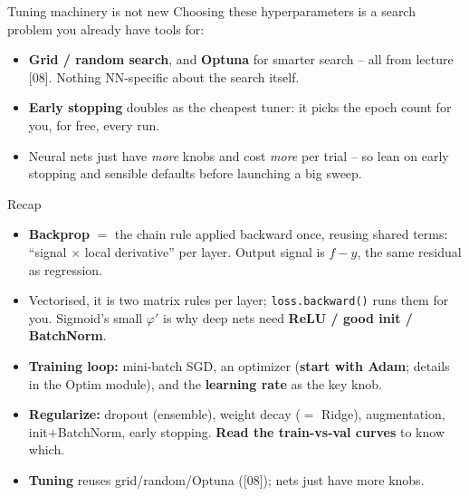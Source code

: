 \documentclass[aspectratio=169]{beamer}
\begin{document}
\begin{frame}{Tuning machinery is not new}
  Choosing these hyperparameters is a search problem you already have tools for:
  \begin{itemize}\small
    \item \textbf{Grid / random search}, and \textbf{Optuna} for smarter search -- all from
      lecture [08]. Nothing NN-specific about the search itself.
    \item \textbf{Early stopping} doubles as the cheapest tuner: it picks the epoch count for
      you, for free, every run.
    \item Neural nets just have \emph{more} knobs and cost \emph{more} per trial -- so lean on
      early stopping and sensible defaults before launching a big sweep.
  \end{itemize}
  \vfill
\end{frame}

\begin{frame}{Recap}
  \begin{itemize}\small
    \item \textbf{Backprop} $=$ the chain rule applied backward once, reusing shared terms:
      ``signal $\times$ local derivative'' per layer. Output signal is $f-y$, the same residual
      as regression.
    \item Vectorised, it is two matrix rules per layer; \texttt{loss.backward()} runs them for
      you. Sigmoid's small $\varphi'$ is why deep nets need \textbf{ReLU / good init / BatchNorm}.
    \item \textbf{Training loop:} mini-batch SGD, an optimizer (\textbf{start with Adam};
      details in the Optim module), and the \textbf{learning rate} as the key knob.
    \item \textbf{Regularize:} dropout (ensemble), weight decay ($=$ Ridge), augmentation,
      init$+$BatchNorm, early stopping. \textbf{Read the train-vs-val curves} to know which.
    \item \textbf{Tuning} reuses grid/random/Optuna ([08]); nets just have more knobs.
  \end{itemize}
  \vfill
\end{frame}
\end{document}
